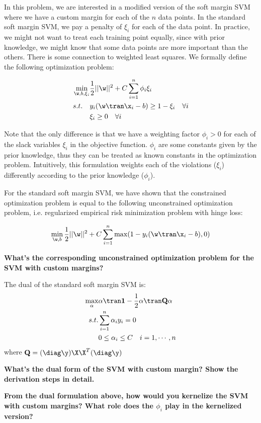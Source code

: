 \documentclass[preview]{standalone}
\begin{document}
In this problem, we are interested in a modified version of the soft margin SVM where we have
a custom margin for each of the $n$ data points. In the standard soft margin SVM, we pay a penalty
of $\xi_i$ for each of the data point. In practice, we might not want to treat each training point
equally, since with prior knowledge, we might know that some data points are more important than the
others. There is some connection to weighted least squares.
We formally define the following optimization problem:

\begin{align}
\min_{\w, b, \xi_i} & \frac{1}{2}||\w||^2 + C\sum_{i=1}^{n} \phi_i \xi_i   \\
s.t. \quad & y_i (\w\tran \x_i -b) \geq 1 - \xi_i \quad \forall i \\
     & \xi_i \geq 0 \quad \forall i
\end{align}

Note that the only difference is that we have a weighting factor $\phi_i > 0$ for each of the slack variables $\xi_i$
in the objective function. $\phi_i$ are some constants given by the prior knowledge, thus they can be treated as
known constants in the optimization problem. Intuitively, this formulation weights each of the violations ($\xi_i$)
differently according to the prior knowledge ($\phi_i$).

\begin{Parts}
\Part For the standard soft margin SVM, we have shown that the constrained optimization problem is equal to the following
unconstrained optimization problem, i.e. regularized empirical risk minimization problem with hinge loss:

\begin{align}
\min_{\w, b} \frac{1}{2} ||\w||^2 + C \sum_{i=1}^{n} \max(1-y_i(\w\tran \x_i - b), 0)
\end{align}

\textbf{What's the corresponding unconstrained optimization problem for the SVM with custom margins?}













\Part The dual of the standard soft margin SVM is:
\begin{align}
\max_{\balpha} & \balpha\tran \mathbf{1} - \frac{1}{2}\balpha\tran \mathbf{Q} \balpha \\
s.t. & \sum_{i=1}^{n} \alpha_i y_i = 0 \\
& 0 \leq \alpha_i  \leq C \quad i=1, \cdots , n
\end{align}
where $\mathbf{Q} = (\diag\y) \X \X^T (\diag \y)$

\textbf{What's the dual form of the SVM with custom margin? Show the derivation steps in detail.  }




\Part \textbf{From the dual formulation above, how would you kernelize the SVM with custom margins?
What role does the $\phi_i$ play in the kernelized version? }




\end{Parts}
\end{document}
